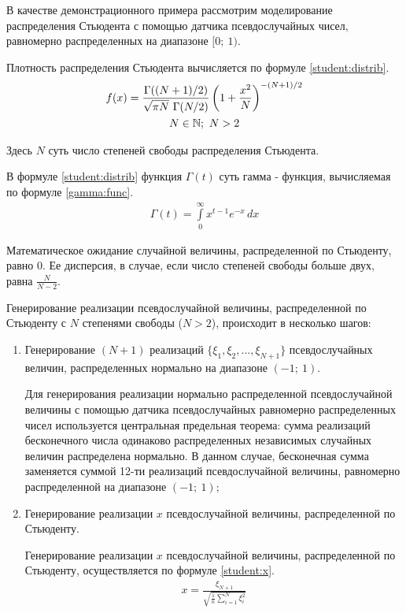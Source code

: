 
В качестве демонстрационного примера рассмотрим моделирование распределения Стьюдента с помощью датчика псевдослучайных чисел, равномерно распределенных на диапазоне $[0 ;~ 1)$.

Плотность распределения Стьюдента вычисляется по формуле \eqref{student:distrib}.
\begin{gather}
	f(x) = \frac{\Gamma((N + 1) / 2)}{\sqrt{\pi N} ~ \Gamma(N / 2)} \left( 1 + \frac{x^2}{N} \right) ^{- (N + 1) / 2} \label{student:distrib} \\
	N \in \mathbb{N} ;~ N > 2 \notag 
\end{gather}

Здесь $N$ суть число степеней свободы распределения Стьюдента. 

В формуле \eqref{student:distrib} функция $\Gamma(t)$ суть гамма - функция, вычисляемая по формуле \eqref{gamma:func}.
\begin{gather}
	\Gamma(t) = \int \limits_0^{\infty} x^{t - 1} e^{-x} \, dx \label{gamma:func}
\end{gather}

Математическое ожидание случайной величины, распределенной по Стьюденту, равно 0. Ее дисперсия, в случае, если число степеней свободы больше двух, равна $\frac{N}{N - 2}$.

Генерирование реализации псевдослучайной величины, распределенной по Стьюденту с $N$ степенями свободы ($N > 2$), происходит в несколько шагов:

\begin{enumerate}

	\item Генерирование $(N + 1)$ реализаций $\{\xi_1, \xi_2, ..., \xi_{N + 1}\}$ псевдослучайных величин, распределенных нормально на диапазоне $(-1 ;~ 1)$.

	Для генерирования реализации нормально распределенной псевдослучайной величины с помощью датчика псевдослучайных равномерно распределенных чисел используется центральная предельная теорема: сумма реализаций бесконечного числа одинаково распределенных независимых случайных величин распределена нормально. В данном случае, бесконечная сумма заменяется суммой 12-ти реализаций псевдослучайной величины, равномерно распределенной на диапазоне $(-1 ;~ 1)$;
	
	\item Генерирование реализации $x$ псевдослучайной величины, распределенной по Стьюденту.

	Генерирование реализации $x$ псевдослучайной величины, распределенной по Стьюденту, осуществляется по формуле \eqref{student:x}.
	\begin{gather}
		x = \frac{\xi_{N + 1}}{\sqrt{\frac{1}{n}\sum \limits_{i = 1}^N \xi_i^2}} \label{student:x}
	\end{gather}

\end{enumerate}

